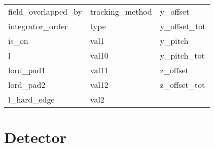 \begin{tabular}{lll}
field_overlapped_by         & tracking_method             & y_offset                    \\
integrator_order            & type                        & y_offset_tot                \\
is_on                       & val1                        & y_pitch                     \\
l                           & val10                       & y_pitch_tot                 \\
lord_pad1                   & val11                       & z_offset                    \\
lord_pad2                   & val12                       & z_offset_tot                \\
l_hard_edge                 & val2                        &                             \\
 \bottomrule
 \end{tabular}
 \vfill
 
 \section{Detector}
 \label{s:list.detector}
 
